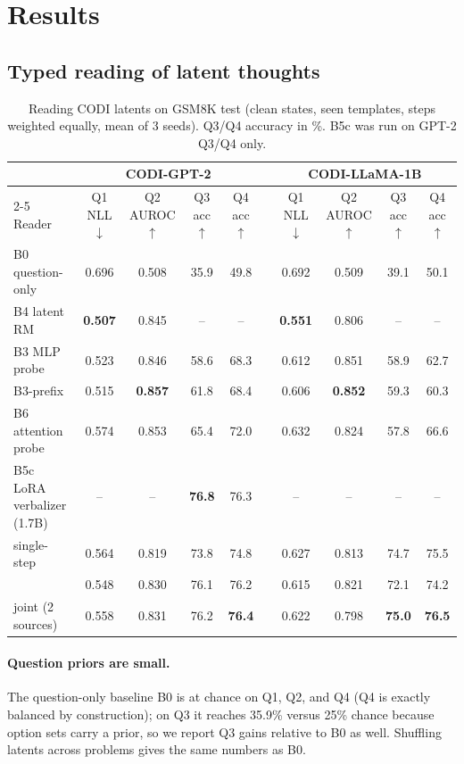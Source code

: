 \section{Results}
\label{sec:results}

\subsection{Typed reading of latent thoughts}
\label{sec:exp-read}

\begin{table}[t]
\centering
\small
\setlength{\tabcolsep}{4pt}
\begin{tabular}{l cccc c cccc}
\toprule
& \multicolumn{4}{c}{CODI-GPT-2} && \multicolumn{4}{c}{CODI-LLaMA-1B}\\
\cmidrule{2-5}\cmidrule{7-10}
Reader & Q1 NLL$\downarrow$ & Q2 AUROC$\uparrow$ & Q3 acc$\uparrow$ & Q4 acc$\uparrow$ && Q1 NLL$\downarrow$ & Q2 AUROC$\uparrow$ & Q3 acc$\uparrow$ & Q4 acc$\uparrow$\\
\midrule
B0 question-only & 0.696 & 0.508 & 35.9 & 49.8 && 0.692 & 0.509 & 39.1 & 50.1\\
B4 latent RM & \textbf{0.507} & 0.845 & -- & -- && \textbf{0.551} & 0.806 & -- & --\\
B3 MLP probe & 0.523 & 0.846 & 58.6 & 68.3 && 0.612 & 0.851 & 58.9 & 62.7\\
B3-prefix & 0.515 & \textbf{0.857} & 61.8 & 68.4 && 0.606 & \textbf{0.852} & 59.3 & 60.3\\
B6 attention probe & 0.574 & 0.853 & 65.4 & 72.0 && 0.632 & 0.824 & 57.8 & 66.6\\
B5c LoRA verbalizer (1.7B) & -- & -- & \textbf{76.8} & 76.3 && -- & -- & -- & --\\
\midrule
\clr{} single-step & 0.564 & 0.819 & 73.8 & 74.8 && 0.627 & 0.813 & 74.7 & 75.5\\
\clr{} & 0.548 & 0.830 & 76.1 & 76.2 && 0.615 & 0.821 & 72.1 & 74.2\\
\clr{} joint (2 sources) & 0.558 & 0.831 & 76.2 & \textbf{76.4} && 0.622 & 0.798 & \textbf{75.0} & \textbf{76.5}\\
\bottomrule
\end{tabular}
\caption{Reading CODI latents on GSM8K test (clean states, seen templates, steps weighted equally, mean of 3 seeds). Q3/Q4 accuracy in \%. B5c was run on GPT-2 Q3/Q4 only.}
\label{tab:main}
\end{table}

\paragraph{Question priors are small.} The question-only baseline B0 is at chance on Q1, Q2, and Q4 (Q4 is exactly balanced by construction); on Q3 it reaches 35.9\% versus 25\% chance because option sets carry a prior, so we report Q3 gains relative to B0 as well. Shuffling latents across problems gives the same numbers as B0.

